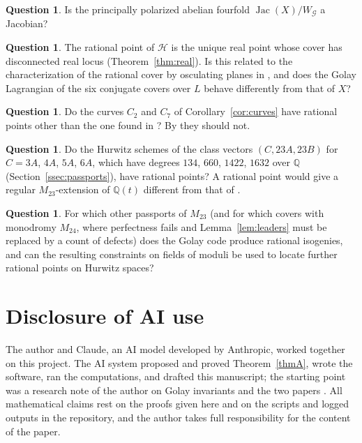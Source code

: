 \documentclass[11pt]{amsart}
\theoremstyle{definition}
\newtheorem{question}[theorem]{Question}
\newcommand{\QQ}{\mathbb{Q}}
\newcommand{\Jac}{\operatorname{Jac}}
\newcommand{\M}{M_{23}}
\newcommand{\cG}{\mathcal{G}}
\newcommand{\cH}{\mathcal{H}}
\begin{document}
\begin{question}
Is the principally polarized abelian fourfold $\Jac(X)/W_\cG$ a Jacobian?
\end{question}

\begin{question}
The rational point of $\cH$ is the unique real point whose cover has disconnected real locus (Theorem~\ref{thm:real}). Is this related to the characterization of the rational cover by osculating planes in \cite{LeLay26}, and does the Golay Lagrangian of the six conjugate covers over $L$ behave differently from that of $X$?
\end{question}

\begin{question}
Do the curves $C_2$ and $C_7$ of Corollary~\ref{cor:curves} have rational points other than the one found in \cite{HJLPPZ26}? By \cite[Conjecture 3.23]{HJLPPZ26} they should not.
\end{question}

\begin{question}
Do the Hurwitz schemes of the class vectors $(C,23A,23B)$ for $C=3A$, $4A$, $5A$, $6A$, which have degrees $134$, $660$, $1422$, $1632$ over $\QQ$ (Section~\ref{ssec:passports}), have rational points? A rational point would give a regular $\M$-extension of $\QQ(t)$ different from that of \cite{HJLPPZ26}.
\end{question}

\begin{question}
For which other passports of $\M$ (and for which covers with monodromy $M_{24}$, where perfectness fails and Lemma~\ref{lem:leaders} must be replaced by a count of defects) does the Golay code produce rational isogenies, and can the resulting constraints on fields of moduli be used to locate further rational points on Hurwitz spaces?
\end{question}

\appendix
\section{Disclosure of AI use}
The author and Claude, an AI model developed by Anthropic, worked together on this project. The AI system proposed and proved Theorem~\ref{thmA}, wrote the software, ran the computations, and drafted this manuscript; the starting point was a research note of the author on Golay invariants and the two papers \cite{HJLPPZ26,Janik26}. All mathematical claims rest on the proofs given here and on the scripts and logged outputs in the repository, and the author takes full responsibility for the content of the paper.
\end{document}
